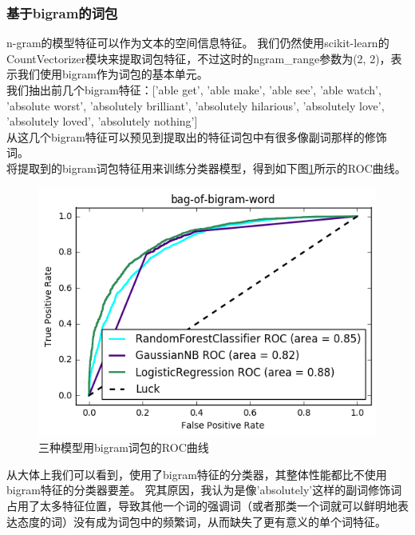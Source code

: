 \subsubsection{基于bigram的词包}
n-gram的模型特征可以作为文本的空间信息特征。
我们仍然使用scikit-learn的CountVectorizer模块来提取词包特征，不过这时的ngram\_range参数为(2, 2)，表示我们使用bigram作为词包的基本单元。\\
我们抽出前几个bigram特征：['able get',
'able make',
'able see',
'able watch',
'absolute worst',
'absolutely brilliant',
'absolutely hilarious',
'absolutely love',
'absolutely loved',
'absolutely nothing'] \\
从这几个bigram特征可以预见到提取出的特征词包中有很多像副词那样的修饰词。\\
将提取到的bigram词包特征用来训练分类器模型，得到如下图\ref{fig:3crocbigram}所示的ROC曲线。
\begin{figure}[h]
\centering
\includegraphics[width=0.9\linewidth]{3c_roc_bigram}
\caption[3c\_roc\_bigram]{三种模型用bigram词包的ROC曲线}
\label{fig:3crocbigram}
\end{figure}
从大体上我们可以看到，使用了bigram特征的分类器，其整体性能都比不使用bigram特征的分类器要差。
究其原因，我认为是像'absolutely'这样的副词修饰词占用了太多特征位置，导致其他一个词的强调词（或者那类一个词就可以鲜明地表达态度的词）没有成为词包中的频繁词，从而缺失了更有意义的单个词特征。\\